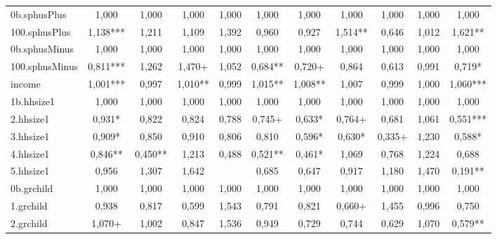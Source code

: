 {\begin{tabular}{l*{10}{c}}
0b.sphusPlus&       1,000   &       1,000   &       1,000   &       1,000   &       1,000   &       1,000   &       1,000   &       1,000   &       1,000   &       1,000   \\
100.sphusPlus&       1,138***&       1,211   &       1,109   &       1,392   &       0,960   &       0,927   &       1,514** &       0,646   &       1,012   &       1,621** \\
0b.sphusMinus&       1,000   &       1,000   &       1,000   &       1,000   &       1,000   &       1,000   &       1,000   &       1,000   &       1,000   &       1,000   \\
100.sphusMinus&       0,811***&       1,262   &       1,470+  &       1,052   &       0,684** &       0,720+  &       0,864   &       0,613   &       0,991   &       0,719*  \\
income      &       1,001***&       0,997   &       1,010** &       0,999   &       1,015** &       1,008** &       1,007   &       0,999   &       1,000   &       1,060***\\
1b.hhsize1  &       1,000   &       1,000   &       1,000   &       1,000   &       1,000   &       1,000   &       1,000   &       1,000   &       1,000   &       1,000   \\
2.hhsize1   &       0,931*  &       0,822   &       0,824   &       0,788   &       0,745+  &       0,633*  &       0,764+  &       0,681   &       1,061   &       0,551***\\
3.hhsize1   &       0,909*  &       0,850   &       0,910   &       0,806   &       0,810   &       0,596*  &       0,630*  &       0,335+  &       1,230   &       0,588*  \\
4.hhsize1   &       0,846** &       0,450** &       1,213   &       0,488   &       0,521** &       0,461*  &       1,069   &       0,768   &       1,224   &       0,688   \\
5.hhsize1   &       0,956   &       1,307   &       1,642   &               &       0,685   &       0,647   &       0,917   &       1,180   &       1,470   &       0,191** \\
0b.grchild  &       1,000   &       1,000   &       1,000   &       1,000   &       1,000   &       1,000   &       1,000   &       1,000   &       1,000   &       1,000   \\
1.grchild   &       0,938   &       0,817   &       0,599   &       1,543   &       0,791   &       0,821   &       0,660+  &       1,455   &       0,996   &       0,750   \\
2.grchild   &       1,070+  &       1,002   &       0,847   &       1,536   &       0,949   &       0,729   &       0,744   &       0,629   &       1,070   &       0,579** \\

\end{tabular}}
